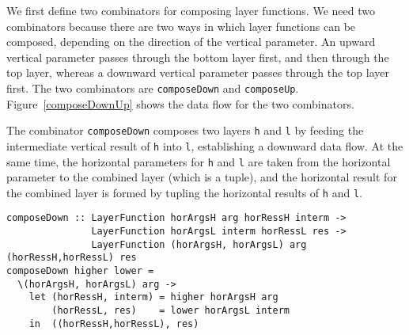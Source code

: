 We first define two combinators for composing layer functions. We need two combinators because there are two ways in which layer functions can be composed, depending on the direction of the vertical parameter. An upward vertical parameter passes through the bottom layer first, and then through the top layer, whereas a downward vertical parameter passes through the top layer first. The two combinators are \texttt{composeDown} and \texttt{composeUp}. Figure~\ref{composeDownUp} shows the data flow for the two combinators. 

The combinator \texttt{composeDown} composes two layers \texttt{h} and \texttt{l} by feeding the intermediate vertical result of \texttt{h} into \texttt{l}, establishing a downward data flow. At the same time, the horizontal parameters for \texttt{h} and \texttt{l} are taken from the horizontal parameter to the combined layer (which is a tuple), and the horizontal result for the combined layer is formed by tupling the horizontal results of \texttt{h} and \texttt{l}.

\begin{small}
\begin{verbatim}
composeDown :: LayerFunction horArgsH arg horRessH interm ->
               LayerFunction horArgsL interm horRessL res ->
               LayerFunction (horArgsH, horArgsL) arg (horRessH,horRessL) res
composeDown higher lower = 
  \(horArgsH, horArgsL) arg ->                                           
    let (horRessH, interm) = higher horArgsH arg
        (horRessL, res)    = lower horArgsL interm            
    in  ((horRessH,horRessL), res)
\end{verbatim}
\end{small}

